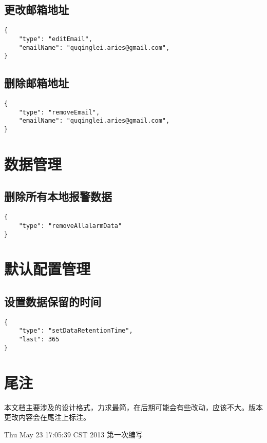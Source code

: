 \documentclass{article}
\begin{document}
\subsection{更改邮箱地址}
\begin{verbatim}
{
    "type": "editEmail",
    "emailName": "quqinglei.aries@gmail.com",
}
\end{verbatim}

\subsection{删除邮箱地址}
\begin{verbatim}
{
    "type": "removeEmail",
    "emailName": "quqinglei.aries@gmail.com",
}
\end{verbatim}

\section{数据管理}
\subsection{删除所有本地报警数据}
\begin{verbatim}
{
    "type": "removeAllalarmData"
}
\end{verbatim}

\section{默认配置管理}
\subsection{设置数据保留的时间}
\begin{verbatim}
{
    "type": "setDataRetentionTime",
    "last": 365
}
\end{verbatim}

\section{尾注}
本文档主要涉及的设计格式，力求最简，在后期可能会有些改动，应该不大。版本
更改内容会在尾注上标注。

Thu May 23 17:05:39 CST 2013 第一次编写
\end{document}
